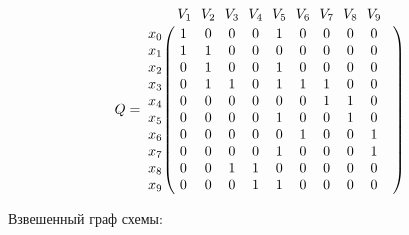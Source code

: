 \documentclass{article}
\begin{document}
\begin{figure}[h]
\end{figure}
$$
Q =
\bordermatrix{ & V_{1} \!&\! V_{2} \!&\! V_{3} \!&\! V_{4} \!&\! V_{5} \!&\! V_{6} \!&\! V_{7} \!&\! V_{8} \!&\! V_{9} \!&\! \cr 
x_{0} \!&\! 1 \!&\! 0 \!&\! 0 \!&\! 0 \!&\! 1 \!&\! 0 \!&\! 0 \!&\! 0 \!&\! 0 \!&\! \cr
x_{1} \!&\! 1 \!&\! 1 \!&\! 0 \!&\! 0 \!&\! 0 \!&\! 0 \!&\! 0 \!&\! 0 \!&\! 0 \!&\! \cr
x_{2} \!&\! 0 \!&\! 1 \!&\! 0 \!&\! 0 \!&\! 1 \!&\! 0 \!&\! 0 \!&\! 0 \!&\! 0 \!&\! \cr
x_{3} \!&\! 0 \!&\! 1 \!&\! 1 \!&\! 0 \!&\! 1 \!&\! 1 \!&\! 1 \!&\! 0 \!&\! 0 \!&\! \cr
x_{4} \!&\! 0 \!&\! 0 \!&\! 0 \!&\! 0 \!&\! 0 \!&\! 0 \!&\! 1 \!&\! 1 \!&\! 0 \!&\! \cr
x_{5} \!&\! 0 \!&\! 0 \!&\! 0 \!&\! 0 \!&\! 1 \!&\! 0 \!&\! 0 \!&\! 1 \!&\! 0 \!&\! \cr
x_{6} \!&\! 0 \!&\! 0 \!&\! 0 \!&\! 0 \!&\! 0 \!&\! 1 \!&\! 0 \!&\! 0 \!&\! 1 \!&\! \cr
x_{7} \!&\! 0 \!&\! 0 \!&\! 0 \!&\! 0 \!&\! 1 \!&\! 0 \!&\! 0 \!&\! 0 \!&\! 1 \!&\! \cr
x_{8} \!&\! 0 \!&\! 0 \!&\! 1 \!&\! 1 \!&\! 0 \!&\! 0 \!&\! 0 \!&\! 0 \!&\! 0 \!&\! \cr
x_{9} \!&\! 0 \!&\! 0 \!&\! 0 \!&\! 1 \!&\! 1 \!&\! 0 \!&\! 0 \!&\! 0 \!&\! 0 \!&\! \cr
}$$

Взвешенный граф схемы:
\end{document}
